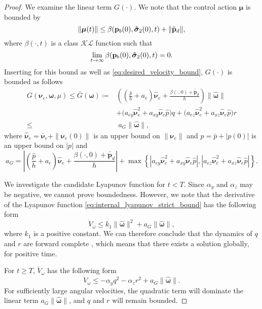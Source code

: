 \begin{proof}
We examine the linear term $G(\cdot)$. We note that the control action $\bm{\mu}$ is bounded by 
\begin{equation}\label{eq:mu_bound}
    \| \bm{\mu}(t) \| \leq \beta(\mathbf{p}_b (0), \bm{\Tilde{\sigma}}_2 (0),t) + \| \ddot{\mathbf{p}}_d\|,
\end{equation}
where $\beta(\cdot, t)$ is a class $\mathcal{KL}$ function \citep[definition 4.3]{khalil_nonlinear_2002} such that
\begin{equation}
    \lim_{t\rightarrow \infty} \beta(\mathbf{p}_b (0), \bm{\Tilde{\sigma}}_2 (0),t) = 0.
\end{equation}
Inserting for this bound as well as \eqref{eq:desired_velocity_bound}, $G(\cdot)$ is bounded as follows
\begin{equation}
\begin{split}
        G(\bm{\nu}_e, \bm{\omega}, \mu) \leq \bar{G}(\bm{\omega}) \coloneqq &\left(\left(\frac{\hat{p}}{h} + a_e \right)\hat{\bm{\nu}}_e + \frac{\beta(\cdot,0) + \bar{\ddot{\mathbf{p}}}_d}{h}\right)\|\hat{\bm{\omega}}\|\\
    &+\bigl(a_{ey} \hat{\bm{\nu}}_e^2 + a_{xy} \hat{\bm{\nu}}_e\hat{p}\bigr)q + \bigl(a_{ez}\hat{\bm{\nu}}_e^2 + a_{xz}\hat{\bm{\nu}}_e\hat{p}\bigr)r\\
    \leq & \;a_G \| \hat{\bm{\omega}}\|,
    \end{split}
\end{equation}
where $\hat{\bm{\nu}}_e = \bar{\bm{\nu}}_e + \|\bm{\nu}_e (0)\|$ is an upper bound on $\| \bm{\nu}_e\|$ and $\hat{p} = \bar{p} + |p(0)|$ is an upper bound on $|p|$ and
\begin{equation}
    a_G \!=\!  \left|\left(\frac{\hat{p}}{h} + a_e \right)\hat{\bm{\nu}}_e + \frac{\beta(\cdot,0) + \bar{\ddot{\mathbf{p}}}_d}{h}\right| +  \max \left\{\left|a_{ey} \hat{\bm{\nu}}_e^2 + a_{xy} \hat{\bm{\nu}}_e\hat{p}\right|,  \left|a_{ez}\hat{\bm{\nu}}_e^2 + a_{xz}\hat{\bm{\nu}}_e\hat{p}\right| \right \}.
\end{equation}

We investigate the candidate Lyapunov function for $t < T$. Since $\alpha_y$ and $\alpha_z$ may be negative, we cannot prove boundedness. However, we note that the derivative of the Lyapunov function \eqref{eq:internal_lyapunov_strict_bound} has the following form
\begin{equation}
    \dot{V}_\omega \leq k_1 \| \hat{\bm{\omega}}\|^2 + a_G \| \hat{\bm{\omega}}\|,
\end{equation}
where $k_1$ is a positive constant. We can therefore conclude that the dynamics of $q$ and $r$ are forward complete \citep{angeli_forward_1999}, which means that there exists a solution globally, for positive time. 

For $t \geq T$, $\dot{V}_\omega$ has the following form
\begin{equation}
    \dot{V}_\omega \leq -\alpha_y q^2 - \alpha_z r^2 + a_G \| \hat{\bm{\omega}}\|.
\end{equation}
For sufficiently large angular velocities, the quadratic term will dominate the linear term $a_G \| \hat{\bm{\omega}}\|$, and $q$ and $r$ will remain bounded.
\end{proof}

